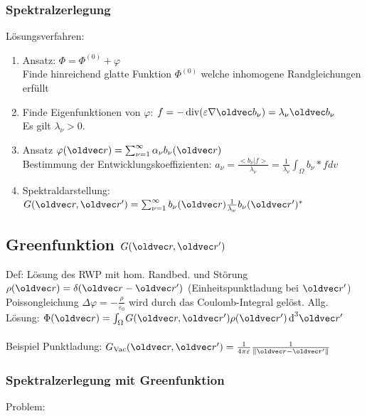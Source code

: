 \documentclass[6pt,a4paper]{scrartcl}
\let\vec\oldvec
\begin{document}
\begin{multicols}{4}
	\subsubsection*{Spektralzerlegung}
	Lösungsverfahren:\\
	\begin{enumerate}
		\item Ansatz: $\Phi = \Phi^{(0)} + \varphi$\\
		Finde hinreichend glatte Funktion $\Phi^{(0)}$ welche inhomogene Randgleichungen erfüllt
		\item Finde Eigenfunktionen von $\varphi$: $f=-\div(\varepsilon \nabla \vec b_\nu) = \lambda_\nu \vec b_\nu$\\
			Es gilt $\lambda_\nu > 0$.
		\item Ansatz $\varphi(\vec r) = \sum_{\nu = 1}^\infty \alpha_\nu b_\nu(\vec r)$\\
		Bestimmung der Entwicklungskoeffizienten: $a_\nu = \frac{<b_\nu|f>}{\lambda_\nu} = \frac{1}{\lambda_\nu}\int_\Omega b_\nu * f dv$\\
		\item Spektraldarstellung: $G(\vec r, \vec r') = \sum_{\nu = 1}^\infty b_\nu (\vec r) \frac{1}{\lambda_\nu} b_\nu (\vec r')^*$\\
	\end{enumerate}
	
	
	
	\subsection{Greenfunktion $G(\vec r, \vec r')$}
	Def: Lösung des RWP mit hom. Randbed. und Störung $\rho(\vec r) = \delta(\vec r - \vec r')$ (Einheitspunktladung bei $\vec r'$)\\
	Poissongleichung $\Delta\varphi = -\frac{\rho}{\varepsilon_0}$ wird durch das Coulomb-Integral gelöst.
	Allg. Lösung: $\Phi(\vec r) = \int_\Omega G(\vec r, \vec r')\rho(\vec r') \diff^3 \vec r'$\\
	\\
	Beispiel Punktladung: $G_{\text{Vac}}(\vec r, \vec r') = \frac{1}{4 \pi \varepsilon} \frac{1}{\norm{\vec r - \vec r'}}$
	
	\subsubsection*{Spektralzerlegung mit Greenfunktion}
	Problem: 


\end{multicols}
\end{document}
